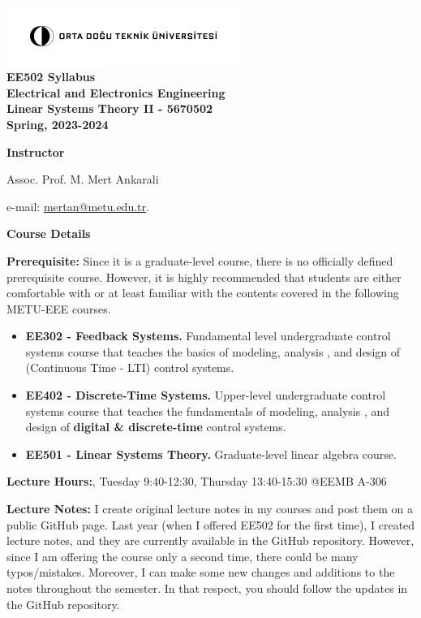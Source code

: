 \documentclass[11pt,oneside]{amsart}
\newcommand{\header}[1]{\bigbreak\textbf{#1}}
\begin{document}
\begin{center}
  \bf
  \includegraphics[width=3in]{metu_logo} \\
  EE502 Syllabus \\
 Electrical and Electronics Engineering \\ 
Linear Systems Theory II - 5670502 \\
Spring, 2023-2024
\end{center}

\header{Instructor} 

\vspace{4pt}

Assoc. Prof. M. Mert Ankarali

e-mail: \url{mertan@metu.edu.tr}.

\header{Course Details}

\vspace{6pt}

\textbf{Prerequisite:} Since it is a graduate-level course, there is no officially defined prerequisite course. However, it is highly recommended that students are either comfortable with or at least familiar with the contents covered in the following METU-EEE courses.


\begin{itemize}
  \item \textbf{EE302 - Feedback Systems.} Fundamental level undergraduate control
    systems course that teaches the basics of modeling, analysis
    , and design of (Continuous Time - LTI) control systems. 
   \item \textbf{EE402 - Discrete-Time Systems.} Upper-level undergraduate control
    systems course that teaches the fundamentals of modeling, analysis
    , and design of \textbf{digital \& discrete-time} control systems. 
   \item \textbf{EE501 - Linear Systems Theory.} Graduate-level linear algebra course.
\end{itemize}

\vspace{9pt}

\textbf{Lecture Hours:}, Tuesday 9:40-12:30, Thursday 13:40-15:30
@EEMB A-306

\vspace{9pt}

\textbf{Lecture Notes:} I create original lecture notes in my courses and post them on a public GitHub page. Last year (when I offered EE502 for the first time), I created lecture notes, and they are currently available in the GitHub repository. However, since I am offering the course only a second time, there could be many typos/mistakes. Moreover, I can make some new changes and additions to the notes throughout the semester. In that respect, you should follow the updates in the GitHub repository. 
\end{document}
